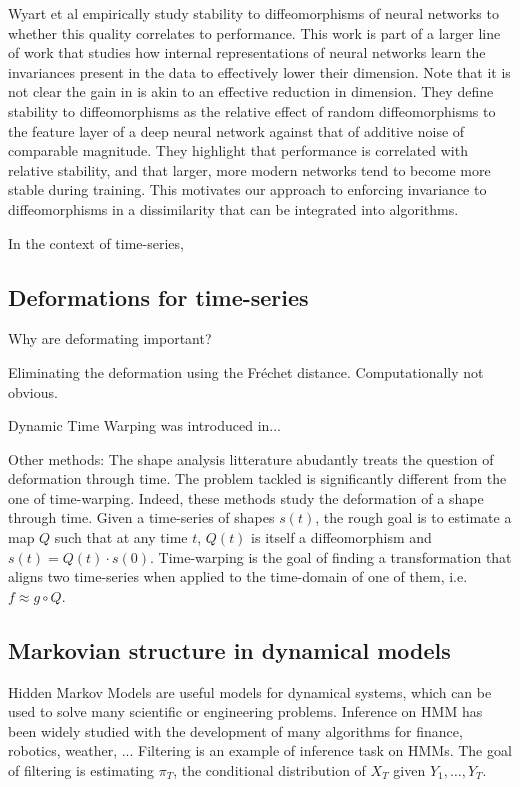Wyart et al empirically study stability to diffeomorphisms of neural networks to whether this quality correlates to performance.
This work is part of a larger line of work that studies how internal representations of neural networks learn the invariances present in the data to effectively lower their dimension. Note that it is not clear the gain in \cite{bietti} is akin to an effective reduction in dimension. They define stability to diffeomorphisms as the relative effect of random diffeomorphisms to the feature layer of a deep neural network against that of additive noise of comparable magnitude. They highlight that performance is correlated with relative stability, and that larger, more modern networks tend to become more stable during training. This motivates our approach to enforcing invariance to diffeomorphisms in a dissimilarity that can be integrated into algorithms.

In the context of time-series,

\subsection{Deformations for time-series}

Why are deformating important?

Eliminating the deformation using the Fréchet distance. Computationally not obvious.

Dynamic Time Warping was introduced in...


Other methods: The shape analysis litterature \cite{younes} abudantly treats the question of deformation through time. The problem tackled is significantly different from the one of time-warping. Indeed, these methods study the deformation of a shape through time. Given a time-series of shapes $s(t)$, the rough goal is to estimate a map $Q$ such that at any time $t$, $Q(t)$ is itself a diffeomorphism and $s(t) = Q(t) \cdot s(0)$. Time-warping is the goal of finding a transformation that aligns two time-series when applied to the time-domain of one of them, i.e. $f \approx g \circ Q$.

\subsection{Markovian structure in dynamical models}
Hidden Markov Models are useful models for dynamical systems, which can be used to solve many scientific or engineering problems. Inference on HMM has been widely studied with the development of many algorithms for finance, robotics, weather, ... Filtering is an example of inference task on HMMs. The goal of filtering is estimating $\pi_T$, the conditional distribution of $X_T$ given $Y_1, \ldots, Y_T$.

